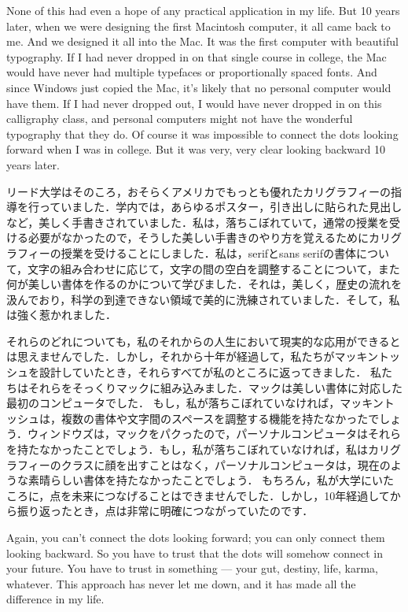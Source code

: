\documentclass[twocolumn]{jsarticle}
\begin{document}
None of this had even a hope of any practical application in my life. But 10 years later, when we were designing the first Macintosh computer, it all came back to me. And we designed it all into the Mac. It was the first computer with beautiful typography. If I had never dropped in on that single course in college, the Mac would have never had multiple typefaces or proportionally spaced fonts. And since Windows just copied the Mac, it's likely that no personal computer would have them. If I had never dropped out, I would have never dropped in on this calligraphy class, and personal computers might not have the wonderful typography that they do. Of course it was impossible to connect the dots looking forward when I was in college. But it was very, very clear looking backward 10 years later.

\newpage

リード大学はそのころ，おそらくアメリカでもっとも優れたカリグラフィーの指導を行っていました．学内では，あらゆるポスター，引き出しに貼られた見出しなど，美しく手書きされていました．私は，落ちこぼれていて，通常の授業を受ける必要がなかったので，そうした美しい手書きのやり方を覚えるためにカリグラフィーの授業を受けることにしました．私は，serifとsans serifの書体について，文字の組み合わせに応じて，文字の間の空白を調整することについて，また何が美しい書体を作るのかについて学びました．それは，美しく，歴史の流れを汲んでおり，科学の到達できない領域で美的に洗練されていました．そして，私は強く惹かれました．

それらのどれについても，私のそれからの人生において現実的な応用ができるとは思えませんでした．しかし，それから十年が経過して，私たちがマッキントッシュを設計していたとき，それらすべてが私のところに返ってきました．
私たちはそれらをそっくりマックに組み込みました．マックは美しい書体に対応した最初のコンピュータでした．
もし，私が落ちこぼれていなければ，マッキントッシュは，複数の書体や文字間のスペースを調整する機能を持たなかったでしょう．ウィンドウズは，マックをパクったので，パーソナルコンピュータはそれらを持たなかったことでしょう．もし，私が落ちこぼれていなければ，私はカリグラフィーのクラスに顔を出すことはなく，パーソナルコンピュータは，現在のような素晴らしい書体を持たなかったことでしょう．
もちろん，私が大学にいたころに，点を未来につなげることはできませんでした．しかし，10年経過してから振り返ったとき，点は非常に明確につながっていたのです．


\newpage

Again, you can't connect the dots looking forward; you can only connect them looking backward. So you have to trust that the dots will somehow connect in your future. You have to trust in something — your gut, destiny, life, karma, whatever. This approach has never let me down, and it has made all the difference in my life.
\end{document}
